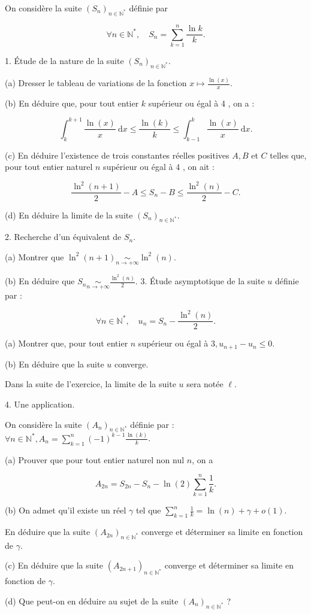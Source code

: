 \documentclass[a4paper, 11pt,reqno]{article}
\begin{document}
\begin{exercice}

On considère la suite $\left(S_{n}\right)_{n \in \mathbb{N}^{*}}$ définie par

$$
\forall n \in \mathbb{N}^{*}, \quad S_{n}=\sum_{k=1}^{n} \frac{\ln k}{k} .
$$

1. Étude de la nature de la suite $\left(S_{n}\right)_{n \in \mathbb{N}^{*}} .$

(a) Dresser le tableau de variations de la fonction $x \mapsto \frac{\ln (x)}{x}$.

(b) En déduire que, pour tout entier $k$ supérieur ou égal à 4 , on a :

$$
\int_{k}^{k+1} \frac{\ln (x)}{x} \mathrm{~d} x \leq \frac{\ln (k)}{k} \leq \int_{k-1}^{k} \frac{\ln (x)}{x} \mathrm{~d} x .
$$

(c) En déduire l'existence de trois constantes réelles positives $A, B$ et $C$ telles que, pour tout entier naturel $n$ supérieur ou égal à 4 , on ait :

$$
\frac{\ln ^{2}(n+1)}{2}-A \leq S_{n}-B \leq \frac{\ln ^{2}(n)}{2}-C .
$$

(d) En déduire la limite de la suite $\left(S_{n}\right)_{n \in \mathbb{N}^{*}}$.

2. Recherche d'un équivalent de $S_{n}$.

(a) Montrer que $\ln ^{2}(n+1) \underset{n \rightarrow+\infty}{\sim} \ln ^{2}(n)$.

(b) En déduire que $S_{n} \underset{n \rightarrow+\infty}{\sim} \frac{\ln ^{2}(n)}{2}$. 3. Étude asymptotique de la suite $u$ définie par :

$$
\forall n \in \mathbb{N}^{*}, \quad u_{n}=S_{n}-\frac{\ln ^{2}(n)}{2} .
$$

(a) Montrer que, pour tout entier $n$ supérieur ou égal à $3, u_{n+1}-u_{n} \leq 0$.

(b) En déduire que la suite $u$ converge.

Dans la suite de l'exercice, la limite de la suite $u$ sera notée $\ell$.

4. Une application.

On considère la suite $\left(A_{n}\right)_{n \in \mathbb{N}^{*}}$ définie par : $\forall n \in \mathbb{N}^{*}, A_{n}=\sum_{k=1}^{n}(-1)^{k-1} \frac{\ln (k)}{k}$.

(a) Prouver que pour tout entier naturel non nul $n$, on a

$$
A_{2 n}=S_{2 n}-S_{n}-\ln (2) \sum_{k=1}^{n} \frac{1}{k} .
$$

(b) On admet qu'il existe un réel $\gamma$ tel que $\sum_{k=1}^{n} \frac{1}{k}=\ln (n)+\gamma+o(1)$.

En déduire que la suite $\left(A_{2 n}\right)_{n \in \mathbb{N}^{*}}$ converge et déterminer sa limite en fonction de $\gamma$.

(c) En déduire que la suite $\left(A_{2 n+1}\right)_{n \in \mathbb{N}^{*}}$ converge et déterminer sa limite en fonction de $\gamma$.

(d) Que peut-on en déduire au sujet de la suite $\left(A_{n}\right)_{n \in \mathbb{N}^{*}}$ ?
\end{exercice}
\end{document}
